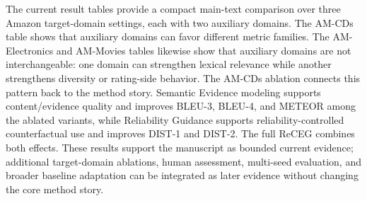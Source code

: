The current result tables provide a compact main-text comparison over three
Amazon target-domain settings, each with two auxiliary domains. The AM-CDs
table shows that auxiliary domains can favor different metric families. The
AM-Electronics and AM-Movies tables likewise show that auxiliary domains are
not interchangeable: one domain can strengthen lexical relevance while another
strengthens diversity or rating-side behavior. The AM-CDs ablation connects
this pattern back to the method story. Semantic Evidence modeling supports
content/evidence quality and improves BLEU-3, BLEU-4, and METEOR among the
ablated variants, while Reliability Guidance supports reliability-controlled
counterfactual use and improves DIST-1 and DIST-2. The full ReCEG combines
both effects. These results support the manuscript as bounded current evidence;
additional target-domain ablations, human assessment, multi-seed evaluation,
and broader baseline adaptation can be integrated as later evidence without
changing the core method story.
